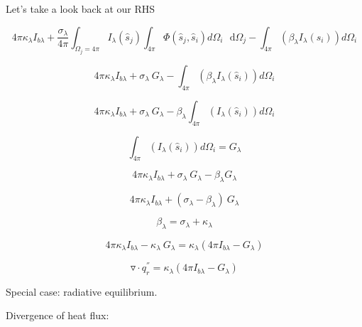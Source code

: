 \documentclass[12pt]{article}
\renewcommand{\_}{\kern-1.5pt\textunderscore\kern-1.5pt}
\begin{document}
Let’s take a look back at our RHS\par

 \[ 4 \pi  \kappa _{ \lambda }I_{b \lambda }+\frac{ \sigma _{ \lambda }}{4 \pi } \int _{ \Omega _{j}=4 \pi }^{}I_{ \lambda } \left( \hat{s}_{j} \right)  \int _{4 \pi }^{} \Phi  \left( \hat{s}_{j},\hat{s}_{i} \right) d \Omega _{i}\text{~ d} \Omega _{j}- \int _{4 \pi }^{} \left(  \beta _{ \lambda }I_{ \lambda } \left( \hat{s}_{i} \right)  \right) d \Omega _{i} \] \par

 \[ 4 \pi  \kappa _{ \lambda }I_{b \lambda }+ \sigma _{ \lambda }~G_{ \lambda }- \int _{4 \pi }^{} \left(  \beta _{ \lambda }I_{ \lambda } \left( \hat{s}_{i} \right)  \right) d \Omega _{i} \] \par

 \[ 4 \pi  \kappa _{ \lambda }I_{b \lambda }+ \sigma _{ \lambda }~G_{ \lambda }- \beta _{ \lambda } \int _{4 \pi }^{} \left( I_{ \lambda } \left( \hat{s}_{i} \right)  \right) d \Omega _{i} \] \par

 \[  \int _{4 \pi }^{} \left( I_{ \lambda } \left( \hat{s}_{i} \right)  \right) d \Omega _{i}=G_{ \lambda } \] \par


\vspace{\baselineskip}
 \[ 4 \pi  \kappa _{ \lambda }I_{b \lambda }+ \sigma _{ \lambda }~G_{ \lambda }- \beta _{ \lambda }G_{ \lambda } \] \par

 \[ 4 \pi  \kappa _{ \lambda }I_{b \lambda }+ \left(  \sigma _{ \lambda }- \beta _{ \lambda } \right) ~G_{ \lambda } \] \par

 \[  \beta _{ \lambda }= \sigma _{ \lambda }+ \kappa _{ \lambda } \] \par

 \[ 4 \pi  \kappa _{ \lambda }I_{b \lambda }- \kappa _{ \lambda }~G_{ \lambda }= \kappa _{ \lambda } \left( 4 \pi I_{b \lambda }-G_{ \lambda } \right)  \] \par

 \[ \triangledown  \cdot q_{r}^{''}= \kappa _{ \lambda } \left( 4 \pi I_{b \lambda }-G_{ \lambda } \right)  \] \par

Special case: radiative equilibrium. \par

Divergence of heat flux:\par
\end{document}
